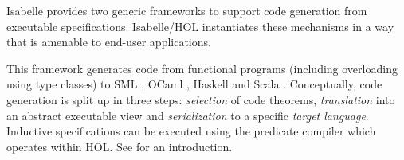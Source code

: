 \begin{isabellebody}
\begin{isamarkuptext}
  Isabelle provides two generic frameworks to support code generation
  from executable specifications.  Isabelle/HOL instantiates these
  mechanisms in a way that is amenable to end-user applications.%
\end{isamarkuptext}%
\isamarkuptrue%
%
\isamarkuptrue%
%
\begin{isamarkuptext}%
This framework generates code from functional programs
  (including overloading using type classes) to SML \cite{SML}, OCaml
  \cite{OCaml}, Haskell \cite{haskell-revised-report} and Scala
  \cite{scala-overview-tech-report}.  Conceptually, code generation is
  split up in three steps: \emph{selection} of code theorems,
  \emph{translation} into an abstract executable view and
  \emph{serialization} to a specific \emph{target language}.
  Inductive specifications can be executed using the predicate
  compiler which operates within HOL.  See \cite{isabelle-codegen} for
  an introduction.


\end{isamarkuptext}
\end{isabellebody}
